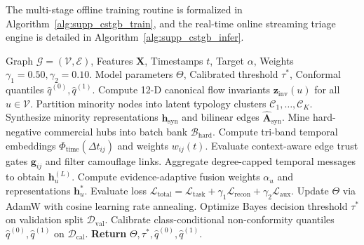 \documentclass[journal,twoside]{IEEEtran}
\begin{document}
The multi-stage offline training routine is formalized in Algorithm~\ref{alg:supp_cstgb_train}, and the real-time online streaming triage engine is detailed in Algorithm~\ref{alg:supp_cstgb_infer}.

\begin{algorithm}[htbp]
\caption{C-STGB Unified Multi-Stage Training Pipeline}
\label{alg:supp_cstgb_train}
\begin{algorithmic}[1]
\Require Graph $\mathcal{G}=(\mathcal{V}, \mathcal{E})$, Features $\mathbf{X}$, Timestamps $t$, Target $\alpha$, Weights $\gamma_1=0.50, \gamma_2=0.10$.
\Ensure Model parameters $\Theta$, Calibrated threshold $\tau^*$, Conformal quantiles $\hat{q}^{(0)}, \hat{q}^{(1)}$.
\State Compute 12-D canonical flow invariants $\mathbf{z}_{\text{inv}}(u)$ for all $u \in \mathcal{V}$.
\State Partition minority nodes into latent typology clusters $\mathcal{C}_1, \dots, \mathcal{C}_K$.
\State Synthesize minority representations $\mathbf{h}_{\text{syn}}$ and bilinear edges $\hat{\mathbf{A}}_{\text{syn}}$.
\State Mine hard-negative commercial hubs into batch bank $\mathcal{B}_{\text{hard}}$.
    \State Compute tri-band temporal embeddings $\Phi_{\text{time}}(\Delta t_{ij})$ and weights $w_{ij}(t)$.
    \State Evaluate context-aware edge trust gates $\mathbf{g}_{ij}$ and filter camouflage links.
    \State Aggregate degree-capped temporal messages to obtain $\mathbf{h}_u^{(L)}$.
    \State Compute evidence-adaptive fusion weights $\alpha_u$ and representations $\mathbf{h}_u^*$.
    \State Evaluate loss $\mathcal{L}_{\text{total}} = \mathcal{L}_{\text{task}} + \gamma_1 \mathcal{L}_{\text{recon}} + \gamma_2 \mathcal{L}_{\text{aux}}$.
    \State Update $\Theta$ via AdamW with cosine learning rate annealing.
\EndFor
\State Optimize Bayes decision threshold $\tau^*$ on validation split $\mathcal{D}_{\text{val}}$.
\State Calibrate class-conditional non-conformity quantiles $\hat{q}^{(0)}, \hat{q}^{(1)}$ on $\mathcal{D}_{\text{cal}}$.
\State \textbf{Return} $\Theta, \tau^*, \hat{q}^{(0)}, \hat{q}^{(1)}$.
\end{algorithmic}
\end{algorithm}
\end{document}
